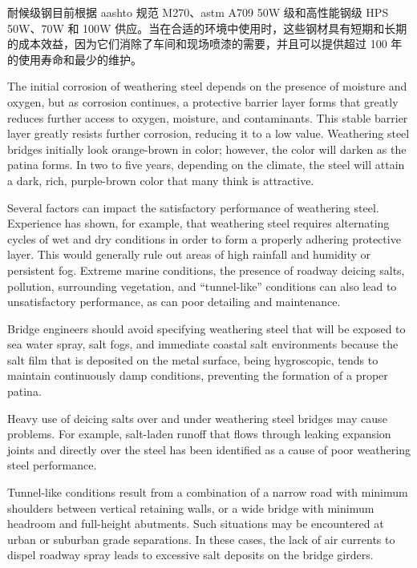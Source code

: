 耐候级钢目前根据 \gls*{aashto} 规范 M270、\acrshort*{astm} A709 50W 级和高性能钢级 HPS 50W、70W 和 100W 供应。当在合适的环境中使用时，这些钢材具有短期和长期的成本效益，因为它们消除了车间和现场喷漆的需要，并且可以提供超过 100 年的使用寿命和最少的维护。

The initial corrosion of weathering steel depends on the presence of moisture and oxygen, but as corrosion continues, a protective barrier layer forms that greatly reduces further access to oxygen, moisture, and contaminants.  This stable barrier layer greatly resists further corrosion, reducing it to a low value. Weathering steel bridges initially look orange-brown in color; however, the color will darken as the patina forms. In two to five years, depending on the climate, the steel will attain a dark, rich, purple-brown color that many think is attractive.

Several factors can impact the satisfactory performance of weathering steel. Experience has shown, for example, that weathering steel requires alternating cycles of wet and dry conditions in order to form a properly adhering protective layer. This would generally rule out areas of high rainfall and humidity or persistent fog. Extreme marine conditions, the presence of roadway deicing salts, pollution, surrounding vegetation, and “tunnel-like” conditions can also lead to unsatisfactory performance, as can poor detailing and maintenance.

Bridge engineers should avoid specifying weathering steel that will be exposed to sea water spray, salt fogs, and immediate coastal salt environments because the salt film that is deposited on the metal surface, being hygroscopic, tends to maintain continuously damp conditions, preventing the formation of a proper patina.

Heavy use of deicing salts over and under weathering steel bridges may cause problems. For example, salt-laden runoff that flows through leaking expansion joints and directly over the steel has been identified as a cause of poor weathering steel performance.

Tunnel-like conditions result from a combination of a narrow road with minimum shoulders between vertical retaining walls, or a wide bridge with minimum headroom and full-height abutments. Such situations may be encountered at urban or suburban grade separations. In these cases, the lack of air currents to dispel roadway spray leads to excessive salt deposits on the bridge girders.

